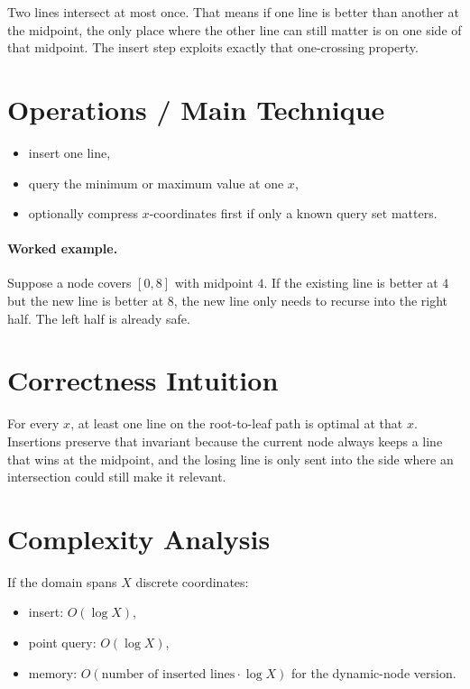 Two lines intersect at most once. That means if one line is better than another at the midpoint, the only place where
the other line can still matter is on one side of that midpoint. The insert step exploits exactly that one-crossing
property.

\section*{Operations / Main Technique}

\begin{itemize}
  \item insert one line,
  \item query the minimum or maximum value at one \(x\),
  \item optionally compress \(x\)-coordinates first if only a known query set matters.
\end{itemize}

\paragraph{Worked example.}
Suppose a node covers \([0, 8]\) with midpoint \(4\). If the existing line is better at \(4\) but the new line is
better at \(8\), the new line only needs to recurse into the right half. The left half is already safe.

\section*{Correctness Intuition}

For every \(x\), at least one line on the root-to-leaf path is optimal at that \(x\). Insertions preserve that
invariant because the current node always keeps a line that wins at the midpoint, and the losing line is only sent into
the side where an intersection could still make it relevant.

\section*{Complexity Analysis}

If the domain spans \(X\) discrete coordinates:
\begin{itemize}
  \item insert: \(O(\log X)\),
  \item point query: \(O(\log X)\),
  \item memory: \(O(\text{number of inserted lines} \cdot \log X)\) for the dynamic-node version.
\end{itemize}

